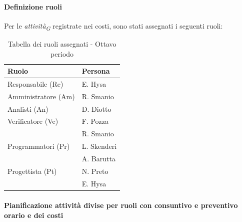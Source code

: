 \paragraph{Definizione ruoli}
Per le \textit{attività}\textsubscript{\textit{G}} registrate nei costi, sono stati assegnati i seguenti ruoli: 

\begin{table}[H]
    \centering
    \begin{tabular}{|L{4cm}|L{2cm}|}
        \hline
        \textbf{Ruolo} & \textbf{Persona} \\
        \hline
        \hline
        Responsabile (Re)   & E. Hysa \\
        \hline
        Amministratore (Am) & R. Smanio \\
        \hline
        Analisti (An)       & D. Diotto \\
        \hline
        Verificatore (Ve)   & F. Pozza \\
                            & R. Smanio \\   
        \hline
        Programmatori (Pr)  & L. Skenderi \\
                            & A. Barutta \\
        \hline
        Progettista (Pt)    & N. Preto \\
                            & E. Hysa \\
        \hline
    \end{tabular}
    \caption{Tabella dei ruoli assegnati - Ottavo periodo}
    \label{tab:Ruoli_persone_8}
\end{table}

\paragraph{Pianificazione attività divise per ruoli con consuntivo e preventivo orario e dei costi}

\vspace{0.4cm}

